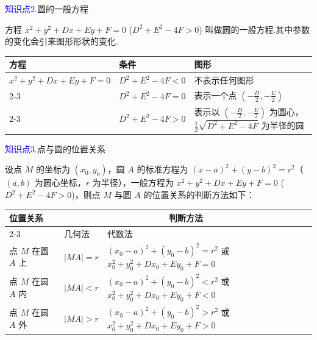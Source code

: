 \documentclass{article}
\begin{document}
\textcolor{blue}{知识点2.}圆的一般方程

方程 \(x^2 + y^2 + Dx + Ey + F = 0\) (\(D^2 + E^2 - 4F > 0\)) 叫做圆的一般方程.其中参数的变化会引来图形形状的变化.

\begin{center}
\begin{tabular}{|m{2.5cm}|m{4cm}|m{5cm}|}
\hline
方程 & 条件 & 图形 \\
\hline
$x^2 + y^2 + Dx + Ey + F = 0$
& $D^2 + E^2 - 4F < 0$ & 不表示任何图形 \\
\cline{2-3}
& $D^2 + E^2 - 4F = 0$ & 表示一个点 $\left(-\frac{D}{2}, -\frac{E}{2}\right)$ \\
\cline{2-3}
& $D^2 + E^2 - 4F > 0$ & 表示以 $\left(-\frac{D}{2}, -\frac{E}{2}\right)$ 为圆心，$\frac{1}{2}\sqrt{D^2 + E^2 - 4F}$ 为半径的圆 \\
\hline
\end{tabular}
\end{center}
\vspace{1\baselineskip}

\textcolor{blue}{知识点3.}点与圆的位置关系

设点 \(M\) 的坐标为 \((x_0, y_0)\)，圆 \(A\) 的标准方程为 \((x - a)^2 + (y - b)^2 = r^2\)（\((a, b)\) 为圆心坐标，\(r\) 为半径），一般方程为 \(x^2 + y^2 + Dx + Ey + F = 0\) (\(D^2 + E^2 - 4F > 0\))，则点 \(M\) 与圆 \(A\) 的位置关系的判断方法如下：

\vspace{1em}

\begin{center}
\begin{tabular}{|m{2cm}|m{2cm}|m{5cm}|}
\hline
\multirow{2}{*}{位置关系} & \multicolumn{2}{c|}{判断方法} \\
\cline{2-3}
 & 几何法 & 代数法 \\
\hline
点 \(M\) 在圆 \(A\) 上 & \(|MA| = r\) & \((x_0 - a)^2 + (y_0 - b)^2 = r^2\) 或 \(x_0^2 + y_0^2 + Dx_0 + Ey_0 + F = 0\) \\
\hline
点 \(M\) 在圆 \(A\) 内 & \(|MA| < r\) & \((x_0 - a)^2 + (y_0 - b)^2 < r^2\) 或 \(x_0^2 + y_0^2 + Dx_0 + Ey_0 + F < 0\) \\
\hline
点 \(M\) 在圆 \(A\) 外 & \(|MA| > r\) & \((x_0 - a)^2 + (y_0 - b)^2 > r^2\) 或 \(x_0^2 + y_0^2 + Dx_0 + Ey_0 + F > 0\) \\
\hline
\end{tabular}
\end{center}
\end{document}
